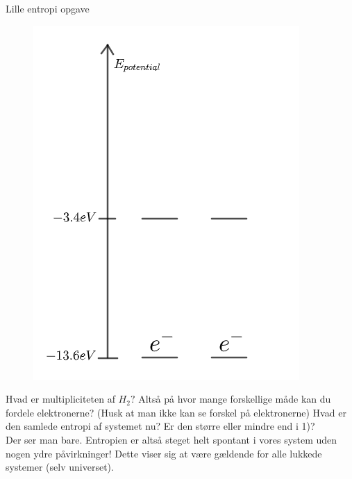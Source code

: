 \documentclass[crop=false, class=memoir]{standalone}
\begin{document}
\begin{opgave}{Lille entropi opgave}
\begin{figure}
    \centering
    \includegraphics[scale=0.4]{Termodynamik/fig/Termoentro2.png}
\end{figure}

\opg Hvad er multipliciteten af $H_{2}?$ Altså på hvor mange forskellige måde kan du fordele elektronerne? (Husk at man ikke kan se forskel på elektronerne)
\opg Hvad er den samlede entropi af systemet nu? Er den større eller mindre end i 1)? \\

\noindent
Der ser man bare. Entropien er altså steget helt spontant i vores system uden nogen ydre påvirkninger! Dette viser sig at være gældende for alle lukkede systemer (selv universet).
\end{opgave}
\end{document}
